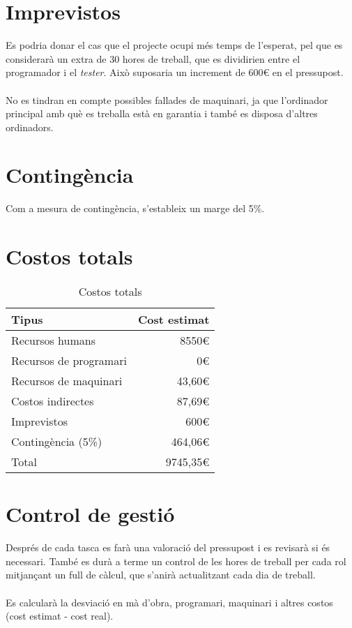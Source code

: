 \section{Imprevistos}
	Es podria donar el cas que el projecte ocupi més temps de l'esperat, pel que es considerarà un extra de 30 hores de treball, que es dividirien entre el programador i el \textit{tester}.
	Això suposaria un increment de 600€ en el pressupost. \\\\
	No es tindran en compte possibles fallades de maquinari, ja que l'ordinador principal amb què es treballa està en garantia i també es disposa d'altres ordinadors.

\section{Contingència}
	Com a mesura de contingència, s'estableix un marge del 5\%.

\section{Costos totals}
	\begin{table}[H]
		\begin{center}
			\begin{tabular}{p{8cm}  !{\vrule width -1pt}r}
				\textbf{Tipus} & \textbf{Cost estimat} \\ \hline
				Recursos humans & 8550€ \\
				Recursos de programari & 0€ \\
				Recursos de maquinari & 43,60€ \\
				Costos indirectes & 87,69€ \\
				Imprevistos & 600€ \\
				Contingència (5\%) & 464,06€ \\
				\noalign{\vskip 4mm}
				Total & 9745,35€
			\end{tabular}
		\end{center}
		\caption{Costos totals}
	\end{table}

\section{Control de gestió}
	Després de cada tasca es farà una valoració del pressupost i es revisarà si és necessari.
	També es durà a terme un control de les hores de treball per cada rol mitjançant un full de càlcul, que s'anirà actualitzant cada dia de treball.\\\\
	Es calcularà la desviació en mà d'obra, programari, maquinari i altres costos (cost estimat - cost real).

